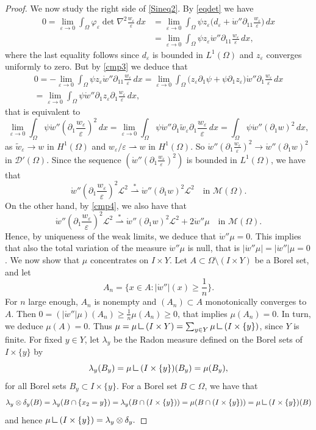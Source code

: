 \documentclass[10pt,a4paper]{amsart}
\newcommand{\calD}{\mathcal{D}}
\newcommand{\calL}{\mathcal{L}}
\newcommand{\calM}{\mathcal{M}}
\newcommand\e{\varepsilon}
\newcommand{\mres}{\mathbin{\vrule height 1.6ex depth 0pt width
		0.13ex\vrule height 0.13ex depth 0pt width 1.3ex}}
\newcommand\weak{\rightharpoonup} %
\newcommand\weakstar{\stackrel{\ast }{\rightharpoonup}}  %
\begin{document}
\begin{proof}
		We now study the right side of \eqref{Sineq2}. By \eqref{eqdet}
		we have
		\begin{align*}
			0=\lim_{\e\to 0}\int_\Omega\varphi_\e \det \nabla^2\frac{w_\e}{\e}\,dx&=\lim_{\e\to 0}\int_\Omega\psi z_\e \big(d_\e+  \mathring{w}''\partial_{11}\frac{w_\e}{\e}\big)\,dx\\&=\lim_{\e\to 0}\int_\Omega\psi z_\e   \mathring{w}''\partial_{11}\frac{w_\e}{\e}\,dx,
		\end{align*}
		where the last equality follows since $d_\e$ is bounded in $L^1(\Omega)$ and $z_\e$ converges uniformly to zero.
		But by \eqref{cmp3} we deduce that
		\begin{multline}
			0=-\lim_{\e\to 0}\int_\Omega\psi z_\e   \mathring{w}''\partial_{11}\frac{w_\e}{\e}\,dx=\lim_{\e\to 0}\int_\Omega\big(z_\e\partial_{1}\psi    +\psi\partial_1z_\e\big)\mathring{w}''\partial_{1}\frac{w_\e}{\e}\,dx \\
			=
			\lim_{\e\to 0}\int_\Omega\psi\mathring{w}''\partial_1z_\e\partial_{1}\frac{w_\e}{\e}\,dx,
		\end{multline}
		that is equivalent to
		$$
		\lim_{\e\to 0}\int_\Omega\psi\mathring{w}''(\partial_1\frac{w_\e}{\e})^2\,dx
		=
		\lim_{\e\to 0}\int_\Omega\psi\mathring{w}''\partial_1\tilde w_\e\partial_{1}\frac{w_\e}{\e}\,dx=\int_\Omega\psi\mathring{w}''(\partial_{1}w)^2\,dx,
		$$
		as $\tilde w_\e\to w$ in $H^1(\Omega)$ and $w_\e/\e\weak w$ in $H^1(\Omega)$.
		So $\mathring{w}''(\partial_1\frac{w_\e}{\e})^2 \to \mathring{w}''(\partial_1 w)^2$ in $\calD'(\Omega)$.
		Since the sequence $(\mathring{w}''(\partial_1\frac{w_\e}{\e})^2)$ is bounded in $L^1(\Omega)$, we have that
		$$\mathring{w}''(\partial_1 \frac{w_\e}{\e})^2 \calL^2 \weakstar \mathring{w}''(\partial_1 w)^2\calL^2  \quad \mbox{in } \calM(\Omega).
		$$
		On the other hand, by \eqref{cmp4}, we also have that
		$$\mathring{w}''(\partial_1 \frac{w_\e}{\e})^2 \calL^2 \weakstar \mathring{w}''(\partial_1 w)^2\calL^2 + 2\mathring{w}''\mu \quad \mbox{in } \calM(\Omega).
		$$
		Hence, by uniqueness of the weak limits, we deduce that $\mathring{w}''\mu=0$.
		This implies that also the total variation of the measure $\mathring{w}''\mu$ is null, that is
		$|\mathring{w}''\mu|=|\mathring{w}''|\mu=0$. We now show that $\mu$ concentrates on $I\times Y$.
		Let $A\subset \Omega\setminus (I\times Y)$ be a Borel set, and let
		$$A_n=\{x\in A:|\mathring{w}''|(x)\ge \frac 1n\}.
		$$
		For $n$ large enough, $A_n$ is nonempty and $(A_n)\subset A$ monotonically converges to $A$. Then $0=
		(|\mathring{w}''|\mu)(A_n)\ge \frac1n\mu(A_n)\ge 0$, that implies  $\mu(A_n)=0$. In turn, we deduce $\mu(A)=0$.  Thus $\mu=\mu\mres (I\times Y)=\sum_{y\in Y} \mu\mres (I\times\{y\})$, since $Y$ is finite.
		For fixed $y\in Y$, let $\lambda_y$ be the Radon measure defined on the Borel sets of $I\times\{y\}$ by
		$$\lambda_y(B_y)=\mu\mres (I\times\{y\})(B_y)=\mu(B_y),
		$$
		for all Borel sets $B_y\subset I\times\{y\}$. For a Borel set $B\subset \Omega$, we have that
		$$\lambda_y\otimes\delta_y(B)=\lambda_y(B\cap \{x_2=y\})=\lambda_y(B\cap( I\times\{y\}))=\mu(B\cap( I\times\{y\}))=\mu\mres (I\times\{y\})(B)
		$$
		and hence $\mu\mres (I\times\{y\})=\lambda_y\otimes\delta_y.$
	\end{proof}
\end{document}
